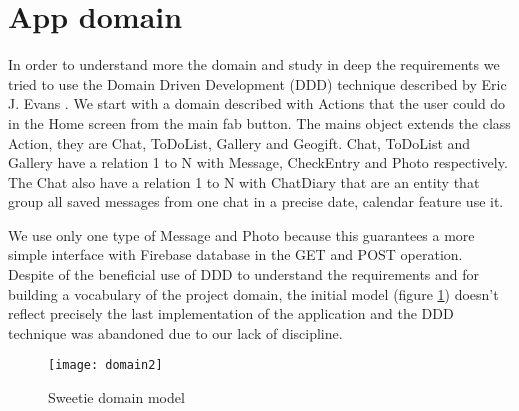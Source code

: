 
\section{App domain}
\label{sec:app-domain}

In order to understand more the domain and study in deep the requirements we tried to use the Domain Driven Development (DDD) technique described by Eric J. Evans \cite{DDD_Eric}. We start with a domain described with Actions that the user could do in the Home screen from the main fab button.
The mains object extends the class Action, they are Chat, ToDoList, Gallery and Geogift. Chat, ToDoList and Gallery have a relation 1 to N with Message, CheckEntry and Photo respectively. The Chat also have a relation 1 to N with ChatDiary that are an entity that group all saved messages from one chat in a precise date, calendar feature use it. 

We use only one type of Message and Photo because this guarantees a more simple interface with Firebase database in the GET and POST operation. Despite of the beneficial use of DDD to understand the requirements and for building a vocabulary of the project domain, the initial model (figure \ref{fig:DDD_model}) doesn't reflect precisely the last implementation of the application and the DDD technique was abandoned due to our lack of discipline.

\begin{figure}[ht]
	\texttt{[image: domain2]}
	\caption{Sweetie domain model}
	\label{fig:DDD_model}
\end{figure}